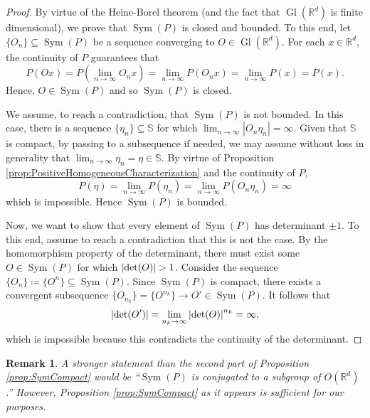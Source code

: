 \documentclass[11pt, letter]{book}
\newtheorem{remark}{Remark}
\newcommand\Gl{\operatorname{Gl}} %
\newcommand\Sym{\operatorname{Sym}}
\renewcommand\det{\operatorname{det}}
\begin{document}
\begin{proof}
By virtue of the Heine-Borel theorem (and the fact that $\Gl(\mathbb{R}^d)$ is finite dimensional), we prove that $\Sym(P)$ is closed and bounded. To this end, let $\{O_n\}\subseteq\Sym(P)$ be a sequence converging to $O\in \Gl(\mathbb{R}^d)$. For each $x\in\mathbb{R}^d$, the continuity of $P$ guarantees that
\begin{equation*}
P(Ox)=P\left(\lim_{n\to\infty}O_nx\right)=\lim_{n\to\infty}P(O_nx)=\lim_{n\to\infty}P(x)=P(x).
\end{equation*}
Hence, $O\in\Sym(P)$ and so $\Sym(P)$ is closed.

We assume, to reach a contradiction, that $\Sym(P)$ is not bounded. In this case, there is a sequence $\{\eta_n\}\subseteq \mathbb{S}$ for which $\lim_{n\to\infty}|O_n\eta_n|=\infty$. Given that $\mathbb{S}$ is compact, by passing to a subsequence if needed, we may assume without loss in generality that $\lim_{n\to\infty}\eta_n=\eta\in\mathbb{S}$. By virtue of Proposition \ref{prop:PositiveHomogeneousCharacterization} and the continuity of $P$,
\begin{equation*}
P(\eta)=\lim_{n\to\infty}P(\eta_n)=\lim_{n\to\infty}P(O_n\eta_n)=\infty
\end{equation*}
which is impossible. Hence $\Sym(P)$ is bounded.

Now, we want to show that every element of $\Sym{(P)}$ has determinant $\pm 1$. To this end, assume to reach a contradiction that this is not the case. By the homomorphism property of the determinant, there must exist some $O\in \Sym(P)$ for which $\abs{\det(O)}>1$. Consider the sequence $\{ O_n\} \coloneqq \{ O^n \} \subseteq \Sym(P)$. Since $\Sym(P)$ is compact, there exists a convergent subsequence $\{ O_{n_k} \} = \{ O^{n_k} \} \to O'\in \Sym(P)$. It follows that
\begin{equation*}
    \abs{\det (O')} = \lim_{n_k \to \infty}\abs{\det(O)}^{n_k} = \infty,
\end{equation*}
which is impossible because this contradicts the continuity of the determinant.
\end{proof}

\begin{remark}
A stronger statement than the second part of Proposition \ref{prop:SymCompact} would be ``$\Sym(P)$ is conjugated to a subgroup of $O(\mathbb{R}^d)$.'' However, Proposition \ref{prop:SymCompact} as it appears is sufficient for our purposes.
\end{remark}
\end{document}
